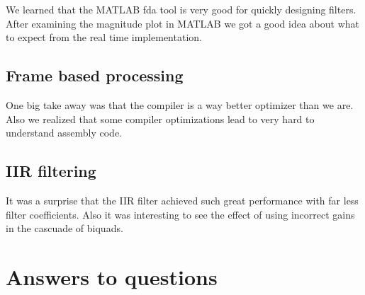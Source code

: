 \documentclass{article}
\begin{document}
We learned that the MATLAB fda tool is very good for quickly designing filters.
After examining the magnitude plot in MATLAB we got a good idea about what to expect from the real time implementation.

\subsection{Frame based processing}

One big take away was that the compiler is a way better optimizer than we are.
Also we realized that some compiler optimizations lead to very hard to understand assembly code.

\subsection{IIR filtering}

It was a surprise that the IIR filter achieved such great performance with far less filter coefficients.
Also it was interesting to see the effect of using incorrect gains in the cascuade of biquads.


\clearpage
\pagebreak
\section{Answers to questions}
\end{document}

